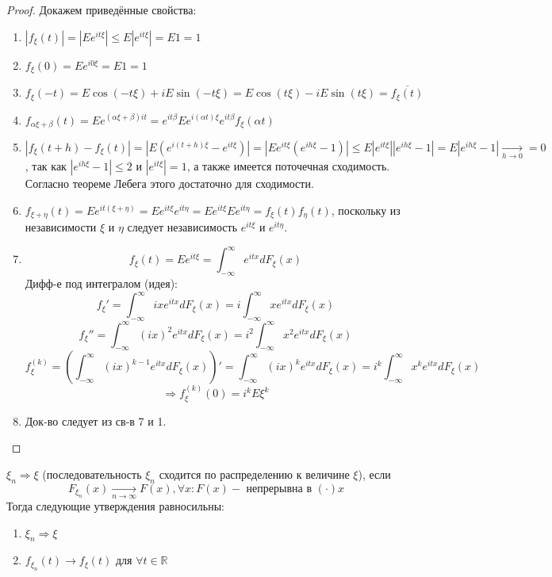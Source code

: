 \begin{proof}
	Докажем приведённые свойства:
	\begin{enumerate}
		\item $|f_{\xi} (t)| = | E e^{it \xi} | \le E |e^{it \xi}| = E1 = 1$
		\item $f_{\xi} (0) = E e^{i 0 \xi} = E1 = 1$
		\item $f_{\xi} (-t) = E \cos (-t \xi) + i E \sin (-t \xi) = E \cos (t \xi) - i E \sin (t \xi) = \overline{f_{\xi} (t)}$
		\item $f_{\alpha \xi + \beta} (t) = E e^{(\alpha \xi + \beta) it} = e^{it \beta} E e^{i (\alpha t) \xi} e^{it \beta} f_{\xi} (\alpha t)$
		\item $|f_{\xi} (t + h) - f_{\xi} (t)| = | E ( e^{i ( t + h ) \xi} - e^{it \xi} ) | = | E e^{it \xi} ( e^{i h \xi} - 1 ) | \le E | e^{it \xi} | | e^{ih \xi} - 1 | = E | e^{ih \xi} - 1 | \underset{h \to 0}{\to} = 0$,
		так как $| e^{ih \xi} - 1 | \le 2$ и $| e^{it \xi} | = 1$, а также имеется поточечная сходимость. Согласно теореме Лебега этого достаточно для сходимости.
		\item $f_{\xi + \eta} (t) = E e^{it (\xi + \eta)} = E e^{it \xi} e^{it \eta} = E e^{it \xi} E e^{it \eta} = f_{\xi} (t) f_{\eta} (t)$, поскольку из независимости $\xi$ и $\eta$ следует независимость $e^{it \xi}$ и $e^{it \eta}$.
		
		\item 
		\[ f_{\xi} (t) = E e^{it \xi} = \int_{-\infty}^{\infty} e^{it x} d F_{\xi} (x) \]
		Дифф-е под интегралом (идея):
		\[ f_{\xi}' = \int_{-\infty}^{\infty} i x e^{it x} d F_{\xi} (x) = i \int_{-\infty}^{\infty} x e^{it x} d F_{\xi} (x) \]
		\[ f_{\xi}'' = \int_{-\infty}^{\infty} (ix)^2 e^{it x} d F_{\xi} (x) = i^2 \int_{-\infty}^{\infty} x^2 e^{it x} d F_{\xi} (x) \]
		\[ f_{\xi}^{(k)} = \left( \int_{-\infty}^{\infty} (ix)^{k-1} e^{itx} d F_{\xi} (x) \right)' = \int_{-\infty}^{\infty} (ix)^k e^{itx} d F_{\xi} (x) = i^k \int_{-\infty}^{\infty} x^k e^{it x} d F_{\xi} (x) \]
		\[ \Rightarrow f_{\xi}^{(k)} (0) = i^k E \xi^k \]
		\item Док-во следует из св-в 7 и 1.
		
	\end{enumerate}
\end{proof}
\begin{definition}\label{sp_property}
	$\xi_n \Rightarrow \xi$ (последовательность $\xi_n$ сходится по распределению к величине $\xi$), если
	\[ F_{\xi_n} (x) \underset{n \to \infty}{\to} F(x), \forall x : F(x) - \text{ непрерывна в } (\cdot) x \]
	Тогда следующие утверждения равносильны:
	\begin{enumerate}
		\item $\xi_n \Rightarrow \xi$
		\item $f_{\xi_n} (t) \to f_{\xi} (t)$ для $\forall t \in \mathbb{R}$
	\end{enumerate}
\end{definition}
